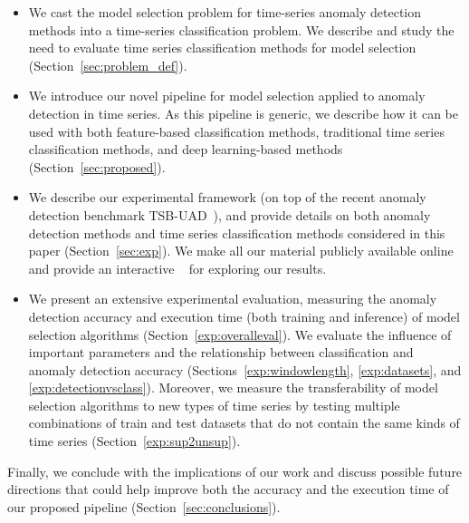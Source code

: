 \begin{itemize}%
	\item We cast the model selection problem for time-series anomaly detection methods into a time-series classification problem. We describe and study the need to evaluate time series classification methods for model selection (Section~\ref{sec:problem_def}). 
	\item We introduce our novel pipeline for model selection applied to anomaly detection in time series. As this pipeline is generic, we describe how it can be used with both feature-based classification methods, traditional time series classification methods, and deep learning-based methods (Section~\ref{sec:proposed}).
	\item We describe our experimental framework (on top of the recent anomaly detection benchmark TSB-UAD~\cite{10.14778/3529337.3529354}), and provide details on both anomaly detection methods and time series classification methods considered in this paper (Section~\ref{sec:exp}). We make all our material publicly available online~\cite{ourcode} and provide an interactive ~\cite{ourwebsite} for exploring our results. 
	\item We present an extensive experimental evaluation, measuring the anomaly detection accuracy and execution time (both training and inference) of model selection algorithms (Section~\ref{exp:overalleval}). We evaluate the influence of important parameters and the relationship between classification and anomaly detection accuracy (Sections~\ref{exp:windowlength}, \ref{exp:datasets}, and \ref{exp:detectionvsclass}). Moreover, we measure the transferability of model selection algorithms to new types of time series by testing multiple combinations of train and test datasets that do not contain the same kinds of time series (Section~\ref{exp:sup2unsup}).
\end{itemize}
Finally, we conclude with the implications of our work and discuss possible future directions that could help improve both the accuracy and the execution time of our proposed pipeline (Section~\ref{sec:conclusions}).